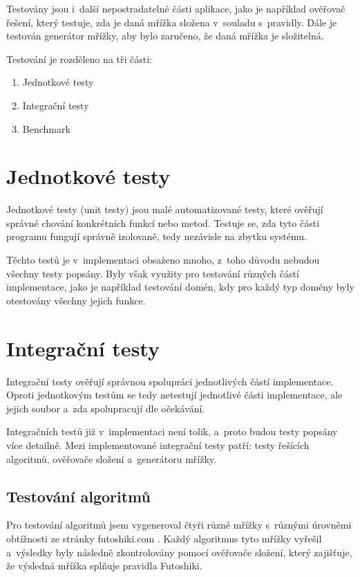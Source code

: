 Testovány jsou i~další nepostradatelné části aplikace, jako je například
ověřovač řešení, který testuje, zda je daná mřížka složena v~souladu
s~pravidly. Dále je testován generátor mřížky, aby bylo zaručeno, že daná
mřížka je složitelná.

Testování je rozděleno na tři části:
\begin{enumerate}
    \item Jednotkové testy
    \item Integrační testy
    \item Benchmark
\end{enumerate}

\section{Jednotkové testy}

Jednotkové testy (unit testy) jsou malé automatizované testy, které ověřují
správné chování konkrétních funkcí nebo metod. Testuje se, zda tyto části
programu fungují správně izolovaně, tedy nezávisle na zbytku systému.

Těchto testů je v~implementaci obsaženo mnoho, z~toho důvodu nebudou všechny
testy popsány. Byly však využity pro testování různých částí implementace, jako
je například testování domén, kdy pro každý typ domény byly otestovány všechny
jejich funkce.

\section{Integrační testy}

Integrační testy ověřují správnou spolupráci jednotlivých částí implementace.
Oproti jednotkovým testům se tedy netestují jednotlivé části implementace, ale
jejich soubor a~zda spolupracují dle očekávání.

Integračních testů již v~implementaci není tolik, a~proto budou testy popsány
více detailně. Mezi implementované integrační testy patří: testy řešících
algoritmů, ověřovače složení a~generátoru mřížky.

\subsection*{Testování algoritmů}

Pro testování algoritmů jsem vygeneroval čtyři různé mřížky s~různými úrovněmi
obtížnosti ze stránky futoshiki.com \cite{FutoshikiCom}. Každý algoritmus tyto
mřížky vyřešil a~výsledky byly následně zkontrolovány pomocí ověřovače složení,
který zajišťuje, že výsledná mřížka splňuje pravidla Futoshiki.

